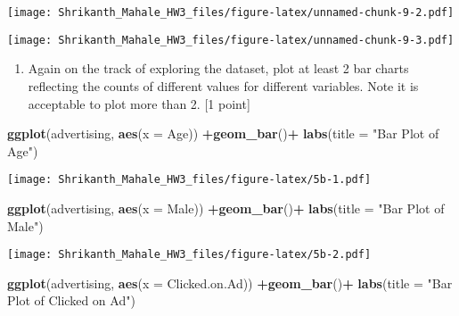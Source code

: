 \documentclass[]{article}
\newenvironment{Shaded}{\begin{snugshade}}{\end{snugshade}}
\newcommand{\KeywordTok}[1]{\textcolor[rgb]{0.13,0.29,0.53}{\textbf{#1}}}
\newcommand{\DataTypeTok}[1]{\textcolor[rgb]{0.13,0.29,0.53}{#1}}
\newcommand{\StringTok}[1]{\textcolor[rgb]{0.31,0.60,0.02}{#1}}
\newcommand{\OperatorTok}[1]{\textcolor[rgb]{0.81,0.36,0.00}{\textbf{#1}}}
\newcommand{\NormalTok}[1]{#1}
\providecommand{\tightlist}{%
  \setlength{\itemsep}{0pt}\setlength{\parskip}{0pt}}
\begin{document}
\texttt{[image: Shrikanth\_Mahale\_HW3\_files/figure-latex/unnamed-chunk-9-2.pdf]}

\begin{Shaded}
\end{Shaded}

\texttt{[image: Shrikanth\_Mahale\_HW3\_files/figure-latex/unnamed-chunk-9-3.pdf]}

\begin{enumerate}
\def\labelenumi{\alph{enumi})}
\setcounter{enumi}{1}
\tightlist
\item
  Again on the track of exploring the dataset, plot at least 2 bar
  charts reflecting the counts of different values for different
  variables. Note it is acceptable to plot more than 2. {[}1 point{]}
\end{enumerate}

\begin{Shaded}
\begin{Highlighting}[]
\KeywordTok{ggplot}\NormalTok{(advertising, }\KeywordTok{aes}\NormalTok{(}\DataTypeTok{x =}\NormalTok{ Age)) }\OperatorTok{+}\KeywordTok{geom_bar}\NormalTok{()}\OperatorTok{+}\StringTok{ }\KeywordTok{labs}\NormalTok{(}\DataTypeTok{title =} \StringTok{"Bar Plot of Age"}\NormalTok{)}
\end{Highlighting}
\end{Shaded}

\texttt{[image: Shrikanth\_Mahale\_HW3\_files/figure-latex/5b-1.pdf]}

\begin{Shaded}
\begin{Highlighting}[]
\KeywordTok{ggplot}\NormalTok{(advertising, }\KeywordTok{aes}\NormalTok{(}\DataTypeTok{x =}\NormalTok{ Male)) }\OperatorTok{+}\KeywordTok{geom_bar}\NormalTok{()}\OperatorTok{+}\StringTok{ }\KeywordTok{labs}\NormalTok{(}\DataTypeTok{title =} \StringTok{"Bar Plot of Male"}\NormalTok{)}
\end{Highlighting}
\end{Shaded}

\texttt{[image: Shrikanth\_Mahale\_HW3\_files/figure-latex/5b-2.pdf]}

\begin{Shaded}
\begin{Highlighting}[]
\KeywordTok{ggplot}\NormalTok{(advertising, }\KeywordTok{aes}\NormalTok{(}\DataTypeTok{x =}\NormalTok{ Clicked.on.Ad)) }\OperatorTok{+}\KeywordTok{geom_bar}\NormalTok{()}\OperatorTok{+}\StringTok{ }\KeywordTok{labs}\NormalTok{(}\DataTypeTok{title =} \StringTok{"Bar Plot of Clicked on Ad"}\NormalTok{)}
\end{Highlighting}
\end{Shaded}
\end{document}

